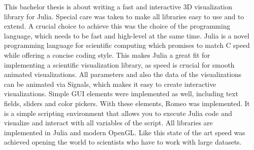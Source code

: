 This bachelor thesis is about writing a fast and interactive 3D visualization library for Julia.
Special care was taken to make all libraries easy to use and to extend.
A crucial choice to achieve this was the choice of the programming language, which needs to be fast and high-level at the same time.
Julia is a novel programming language for scientific computing which promises to match C speed while offering a concise coding style. 
This makes Julia a great fit for implementing a scientific visualization library, as speed is crucial for smooth animated visualizations.
All parameters and also the data of the visualizations can be animated via Signals, which makes it easy to create interactive visualizations.
Simple \ac{GUI} elements were implemented as well, including text fields, sliders and color pickers. 
With these elements, Romeo was implemented. It is a simple scripting environment that allows you to execute Julia code and visualize and interact with all variables of the script.
All libraries are implemented in Julia and modern \ac{OpenGL}. 
Like this state of the art speed was achieved opening the world to scientists who have to work with large datasets.

